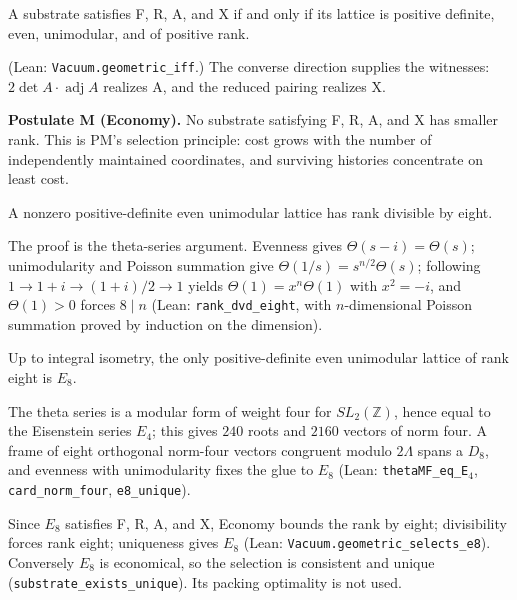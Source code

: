 \begin{theorem}[Equivalence]
A substrate satisfies F, R, A, and X if and only if its lattice is positive definite, even, unimodular, and of positive rank.
\end{theorem}
(Lean: \texttt{Vacuum.geometric\_iff}.) The converse direction supplies the witnesses: $2\det A\cdot\operatorname{adj}A$ realizes A, and the reduced pairing realizes X.

\textbf{Postulate M (Economy).} No substrate satisfying F, R, A, and X has smaller rank. This is PM's selection principle: cost grows with the number of independently maintained coordinates, and surviving histories concentrate on least cost.

\begin{theorem}
A nonzero positive-definite even unimodular lattice has rank divisible by eight.
\end{theorem}
The proof is the theta-series argument\cite{serre_course_1973,conway_sphere_1988}. Evenness gives $\Theta(s-i)=\Theta(s)$; unimodularity and Poisson summation give $\Theta(1/s)=s^{n/2}\Theta(s)$; following $1\to1+i\to(1+i)/2\to1$ yields $\Theta(1)=x^n\Theta(1)$ with $x^2=-i$, and $\Theta(1)>0$ forces $8\mid n$ (Lean: \texttt{rank\_dvd\_eight}, with $n$-dimensional Poisson summation proved by induction on the dimension).

\begin{theorem}
Up to integral isometry, the only positive-definite even unimodular lattice of rank eight is $E_8$.
\end{theorem}
The theta series is a modular form of weight four for $SL_2(\mathbb Z)$, hence equal to the Eisenstein series $E_4$; this gives $240$ roots and $2160$ vectors of norm four. A frame of eight orthogonal norm-four vectors congruent modulo $2\Lambda$ spans a $D_8$, and evenness with unimodularity fixes the glue to $E_8$ (Lean: \texttt{thetaMF\_eq\_E}$_4$, \texttt{card\_norm\_four}, \texttt{e8\_unique}).

Since $E_8$ satisfies F, R, A, and X, Economy bounds the rank by eight; divisibility forces rank eight; uniqueness gives $E_8$ (Lean: \texttt{Vacuum.geometric\_selects\_e8}). Conversely $E_8$ is economical, so the selection is consistent and unique (\texttt{substrate\_exists\_unique}). Its packing optimality\cite{viazovska_sphere_2017} is not used.

